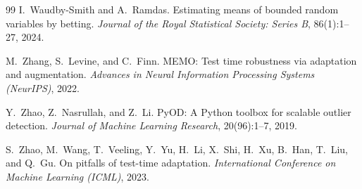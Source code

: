\begin{thebibliography}{99}
I.~Waudby-Smith and A.~Ramdas.
Estimating means of bounded random variables by betting.
\textit{Journal of the Royal Statistical Society: Series B}, 86(1):1--27, 2024.

M.~Zhang, S.~Levine, and C.~Finn.
MEMO: Test time robustness via adaptation and augmentation.
\textit{Advances in Neural Information Processing Systems (NeurIPS)}, 2022.

Y.~Zhao, Z.~Nasrullah, and Z.~Li.
PyOD: A Python toolbox for scalable outlier detection.
\textit{Journal of Machine Learning Research}, 20(96):1--7, 2019.

S.~Zhao, M.~Wang, T.~Veeling, Y.~Yu, H.~Li, X.~Shi, H.~Xu, B.~Han,
T.~Liu, and Q.~Gu.
On pitfalls of test-time adaptation.
\textit{International Conference on Machine Learning (ICML)}, 2023.

\end{thebibliography}

